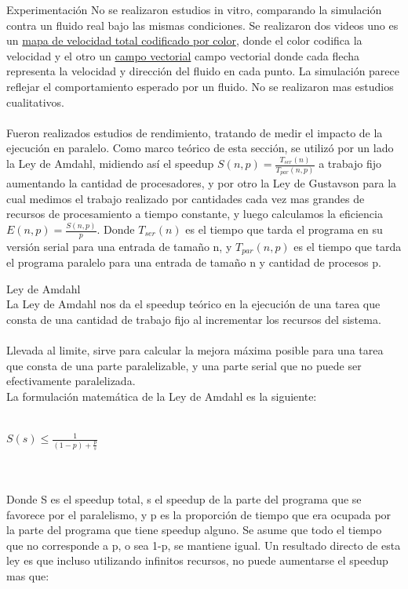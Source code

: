 
\begin{section}{Experimentación}
 No se realizaron estudios in vitro, comparando la simulación contra un fluido real bajo las mismas condiciones. Se realizaron dos videos uno es un \href{https://www.youtube.com/watch?v=D8JOELu8uAs}{mapa de velocidad total codificado por color}, donde el color codifica la velocidad y el otro un \href{https://www.youtube.com/watch?v=_JisfmOIEdU}{campo vectorial}
 campo vectorial donde cada flecha representa la velocidad y dirección del fluido en cada punto. La simulación parece reflejar el comportamiento esperado por un fluido. No se realizaron mas estudios cualitativos.
~\\
~\\
Fueron realizados estudios de rendimiento, tratando de medir el impacto de la ejecución en paralelo. Como marco teórico de esta sección, se utilizó por un lado la Ley de Amdahl, midiendo así el speedup  $S(n,p) = \frac{T_{ser}(n) }{ T_{par}(n,p)}$  a trabajo fijo aumentando la cantidad de procesadores, y por otro la Ley de Gustavson para la cual medimos el trabajo realizado por cantidades cada vez mas grandes de recursos de procesamiento a tiempo constante, y luego calculamos la eficiencia $E(n,p) = \frac{S(n,p)}{p}$. Donde $ T_{ser}(n)$  es el tiempo que tarda el programa en su versión serial para una entrada de tamaño n, y $T_{par}(n,p)$  es el tiempo que tarda el programa paralelo para una entrada de tamaño n y cantidad de procesos p.

\begin{subsection}{Ley de Amdahl}
~\\
La Ley de Amdahl nos da el speedup teórico en la ejecución de una tarea que consta de una cantidad de trabajo fijo al incrementar los recursos del sistema.
~\\
~\\
Llevada al limite, sirve para calcular la mejora máxima posible para una tarea que consta de una parte paralelizable, y una parte serial que no puede ser efectivamente paralelizada.
~\\
La formulación matemática de la Ley de Amdahl es la siguiente:
~\\
~\\
\begin{center}
$S(s) \leq  \frac{1}{(1-p)+\frac{p}{s}}$
\end{center}
~\\
~\\
Donde S es el speedup total, s el speedup de la parte del programa que se favorece por el paralelismo, y p es la proporción de tiempo que era ocupada por la parte del programa que tiene speedup alguno. Se asume que todo el tiempo que no corresponde a p, o sea 1-p, se mantiene igual. Un resultado directo de esta ley es que incluso utilizando infinitos recursos, no puede aumentarse el speedup mas que:


\end{subsection}
\end{section}
